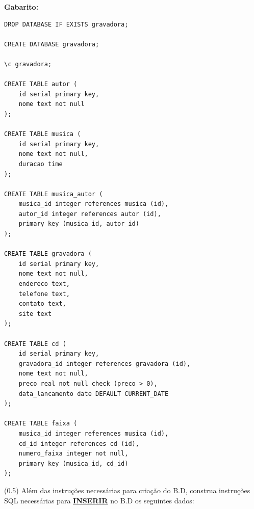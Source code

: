 \documentclass[12pt]{exam}
\begin{document}
\begin{questions}
\textbf{Gabarito:}
\begin{verbatim}
DROP DATABASE IF EXISTS gravadora;

CREATE DATABASE gravadora;

\c gravadora;

CREATE TABLE autor (
    id serial primary key,
    nome text not null
);

CREATE TABLE musica (
    id serial primary key,
    nome text not null,
    duracao time
);

CREATE TABLE musica_autor (
    musica_id integer references musica (id),
    autor_id integer references autor (id),
    primary key (musica_id, autor_id)
);

CREATE TABLE gravadora (
    id serial primary key,
    nome text not null,
    endereco text,
    telefone text,
    contato text,
    site text
);

CREATE TABLE cd (
    id serial primary key,
    gravadora_id integer references gravadora (id),
    nome text not null,
    preco real not null check (preco > 0),
    data_lancamento date DEFAULT CURRENT_DATE
);

CREATE TABLE faixa (
    musica_id integer references musica (id),
    cd_id integer references cd (id),
    numero_faixa integer not null,
    primary key (musica_id, cd_id)
);
\end{verbatim}

\question (0.5) Além das instruções necessárias para criação do B.D, construa instruções SQL necessárias para \textbf{\underline{INSERIR}} no B.D os seguintes dados:


\end{questions}
\end{document}
